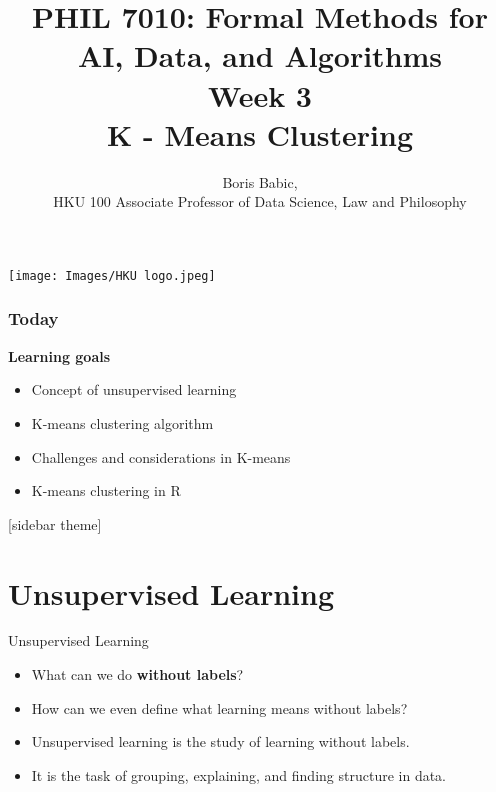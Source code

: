 \documentclass[xcolor=dvipsnames, 9pt]{beamer} %
\title[Week 3]{\normalsize{PHIL 7010: Formal Methods for AI, Data, and Algorithms \vspace{0.5cm} \\Week 3 \\ K - Means Clustering}}
\author[Boris Babic, HKU]{Boris Babic, \\HKU 100 Associate Professor of Data Science, Law and Philosophy}
\institute[]{}
\date{}
\begin{document}

\begin{frame}
\titlepage
\begin{center}
\texttt{[image: Images/HKU logo.jpeg]}
\end{center}
\end{frame}

\begin{frame}
\frametitle{Today}
\textbf{Learning goals}

\begin{itemize}
\item Concept of unsupervised learning
\item K-means clustering algorithm
\item Challenges and considerations in K-means
\item K-means clustering in R
\end{itemize}

\end{frame}

[sidebar theme]
\section{Unsupervised Learning}

\begin{frame}{Unsupervised Learning}
\begin{itemize}
    \item What can we do \textbf{without labels}?
    \item How can we even define what learning means without labels?
    \item Unsupervised learning is the study of learning without labels.
    \item It is the task of grouping, explaining, and finding structure in data.
\end{itemize}
\end{frame}
\end{document}
